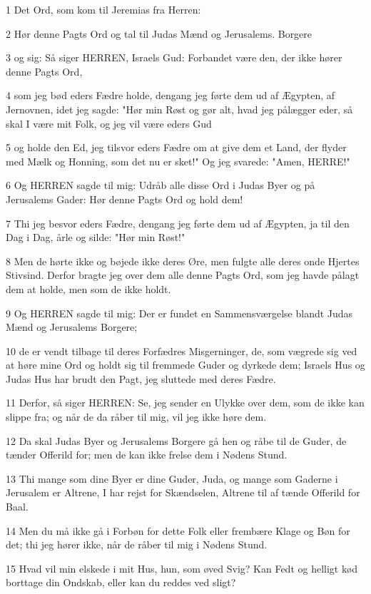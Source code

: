 \par 1 Det Ord, som kom til Jeremias fra Herren:
\par 2 Hør denne Pagts Ord og tal til Judas Mænd og Jerusalems. Borgere
\par 3 og sig: Så siger HERREN, Israels Gud: Forbandet være den, der ikke hører denne Pagts Ord,
\par 4 som jeg bød eders Fædre holde, dengang jeg førte dem ud af Ægypten, af Jernovnen, idet jeg sagde: "Hør min Røst og gør alt, hvad jeg pålægger eder, så skal I være mit Folk, og jeg vil være eders Gud
\par 5 og holde den Ed, jeg tilsvor eders Fædre om at give dem et Land, der flyder med Mælk og Honning, som det nu er sket!" Og jeg svarede: "Amen, HERRE!"
\par 6 Og HERREN sagde til mig: Udråb alle disse Ord i Judas Byer og på Jerusalems Gader: Hør denne Pagts Ord og hold dem!
\par 7 Thi jeg besvor eders Fædre, dengang jeg førte dem ud af Ægypten, ja til den Dag i Dag, årle og silde: "Hør min Røst!"
\par 8 Men de hørte ikke og bøjede ikke deres Øre, men fulgte alle deres onde Hjertes Stivsind. Derfor bragte jeg over dem alle denne Pagts Ord, som jeg havde pålagt dem at holde, men som de ikke holdt.
\par 9 Og HERREN sagde til mig: Der er fundet en Sammensværgelse blandt Judas Mænd og Jerusalems Borgere;
\par 10 de er vendt tilbage til deres Forfædres Misgerninger, de, som vægrede sig ved at høre mine Ord og holdt sig til fremmede Guder og dyrkede dem; Israels Hus og Judas Hus har brudt den Pagt, jeg sluttede med deres Fædre.
\par 11 Derfor, så siger HERREN: Se, jeg sender en Ulykke over dem, som de ikke kan slippe fra; og når de da råber til mig, vil jeg ikke høre dem.
\par 12 Da skal Judas Byer og Jerusalems Borgere gå hen og råbe til de Guder, de tænder Offerild for; men de kan ikke frelse dem i Nødens Stund.
\par 13 Thi mange som dine Byer er dine Guder, Juda, og mange som Gaderne i Jerusalem er Altrene, I har rejst for Skændselen, Altrene til af tænde Offerild for Baal.
\par 14 Men du må ikke gå i Forbøn for dette Folk eller frembære Klage og Bøn for det; thi jeg hører ikke, når de råber til mig i Nødens Stund.
\par 15 Hvad vil min elskede i mit Hus, hun, som øved Svig? Kan Fedt og helligt kød borttage din Ondskab, eller kan du reddes ved sligt?
